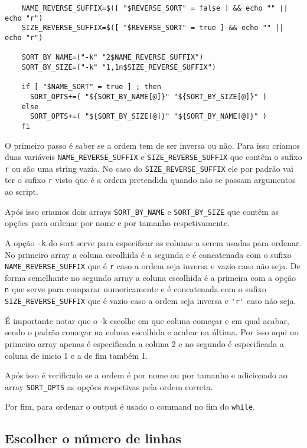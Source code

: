 {\begin{listing}[H]
	\centering
	\begin{verbatim}
    NAME_REVERSE_SUFFIX=$([ "$REVERSE_SORT" = false ] && echo "" || echo "r")
    SIZE_REVERSE_SUFFIX=$([ "$REVERSE_SORT" = true ] && echo "" || echo "r")

    SORT_BY_NAME=("-k" "2$NAME_REVERSE_SUFFIX")
    SORT_BY_SIZE=("-k" "1,1n$SIZE_REVERSE_SUFFIX")

    if [ "$NAME_SORT" = true ] ; then
      SORT_OPTS+=( "${SORT_BY_NAME[@]}" "${SORT_BY_SIZE[@]}" )
    else
      SORT_OPTS+=( "${SORT_BY_SIZE[@]}" "${SORT_BY_NAME[@]}" )
    fi
  \end{verbatim}
\end{listing}

O primeiro passo é saber se a ordem tem de ser inversa ou não.
Para isso criamos duas variáveis \Verb|NAME_REVERSE_SUFFIX| e \Verb|SIZE_REVERSE_SUFFIX| que contêm o sufixo \Verb|r| ou são uma string vazia.
No caso do \Verb|SIZE_REVERSE_SUFFIX| ele por padrão vai ter o sufixo \Verb|r| visto que é a ordem pretendida quando não se passam argumentos ao script.

Após isso criamos dois arrays \Verb|SORT_BY_NAME| e \Verb|SORT_BY_SIZE| que contêm as opções para ordenar por nome e por tamanho respetivamente.

A opção \Verb|-k| do sort serve para especificar as colunas a serem usadas para ordenar.
No primeiro array a coluna escolhida é a segunda e é concatenada com o sufixo \Verb|NAME_REVERSE_SUFFIX| que é \Verb|r| caso a ordem seja inversa e vazio caso não seja.
De forma semelhante no segundo array a coluna escolhida é a primeira com a opção \Verb|n| que serve para comparar numericamente e é concatenada com o sufixo \Verb|SIZE_REVERSE_SUFFIX| que é vazio caso a ordem seja inversa e \Verb|'r'| caso não seja.

É importante notar que o -k escolhe em que coluna começar e em qual acabar, sendo o padrão começar na coluna escolhida e acabar na última.
Por isso aqui no primeiro array apenas é especificada a coluna 2 e no segundo é especificada a coluna de inicio 1 e a de fim também 1.

Após isso é verificado se a ordem é por nome ou por tamanho e adicionado ao array \Verb|SORT_OPTS| as opções respetivas pela ordem correta.

Por fim, para ordenar o output é usado o command  no fim do \Verb|while|.

\subsection{Escolher o número de linhas}\label{sec:implementation_head}

}
